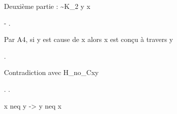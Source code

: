 \documentclass[10pt]{report}
\begin{document}
\begin{coqdoccode}
\coqdocemptyline
\coqdocindent{1.00em}
\begin{coqdoccomment}
\coqdocindent{0.50em}
Deuxième\coqdocindent{0.50em}
partie\coqdocindent{0.50em}
:\coqdocindent{0.50em}
\~{}K\_2\coqdocindent{0.50em}
y\coqdocindent{0.50em}
x\coqdocindent{0.50em}
\end{coqdoccomment}
\coqdoceol
\coqdocindent{1.00em}
-  .\coqdoceol
\coqdocindent{2.00em}
\begin{coqdoccomment}
\coqdocindent{0.50em}
Par\coqdocindent{0.50em}
A4,\coqdocindent{0.50em}
si\coqdocindent{0.50em}
y\coqdocindent{0.50em}
est\coqdocindent{0.50em}
cause\coqdocindent{0.50em}
de\coqdocindent{0.50em}
x\coqdocindent{0.50em}
alors\coqdocindent{0.50em}
x\coqdocindent{0.50em}
est\coqdocindent{0.50em}
conçu\coqdocindent{0.50em}
à\coqdocindent{0.50em}
travers\coqdocindent{0.50em}
y\coqdocindent{0.50em}
\end{coqdoccomment}
\coqdoceol
\coqdocindent{2.00em}
   .\coqdoceol
\coqdocindent{2.00em}
\begin{coqdoccomment}
\coqdocindent{0.50em}
Contradiction\coqdocindent{0.50em}
avec\coqdocindent{0.50em}
H\_no\_Cxy\coqdocindent{0.50em}
\end{coqdoccomment}
\coqdoceol
\coqdocindent{2.00em}
.\coqdoceol
\coqdocnoindent
{}.\coqdoceol
\coqdocemptyline
\end{coqdoccode}
x neq y -> y neq x 
\end{document}
